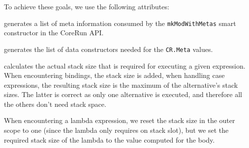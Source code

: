 \documentclass{scrartcl}
\newcommand{\attrdesc}[2]{\texttt{#1}, \emph{#2}}
\begin{document}
To achieve these goals, we use the following attributes:

\begin{description}[style=multiline,leftmargin=4cm,font=\normalfont]

\item[\attrdesc{crmetal :: [CR.Meta]}{synthesized}] generates a list of meta information consumed by the \texttt{mkModWithMetas} smart constructor in the CoreRun API.

\item[\attrdesc{crdataconl :: [CR.DataCon]}{synthesized}] generates the list of data constructors needed for the \texttt{CR.Meta} values.

\item[\attrdesc{stksize :: Int}{synthesized}] calculates the actual stack size that is required for executing a given expression. When encountering bindings, the stack size is added, when handling case expressions, the resulting stack size is the maximum of the alternative's stack sizes. The latter is correct as only one alternative is executed, and therefore all the others don't need stack space.

When encountering a lambda expression, we reset the stack size in the outer scope to one (since the lambda only requires on stack slot), but we set the required stack size of the lambda to the value computed for the body.

\end{description}
\end{document}
